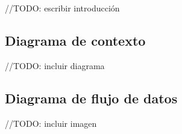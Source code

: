 //TODO: escribir introducción

\subsection{Diagrama de contexto}

//TODO: incluir diagrama


\subsection{Diagrama de flujo de datos}

//TODO: incluir imagen